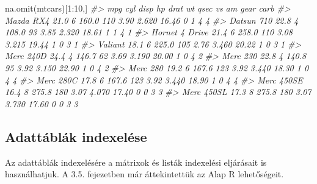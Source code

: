 \documentclass[
]{book}
\newenvironment{Shaded}{\begin{snugshade}}{\end{snugshade}}
\newcommand{\CommentTok}[1]{\textcolor[rgb]{0.56,0.35,0.01}{\textit{#1}}}
\newcommand{\DecValTok}[1]{\textcolor[rgb]{0.00,0.00,0.81}{#1}}
\newcommand{\FunctionTok}[1]{\textcolor[rgb]{0.00,0.00,0.00}{#1}}
\newcommand{\NormalTok}[1]{#1}
\newcommand{\SpecialCharTok}[1]{\textcolor[rgb]{0.00,0.00,0.00}{#1}}
\begin{document}
\begin{Shaded}
\begin{Highlighting}[]
\FunctionTok{na.omit}\NormalTok{(mtcars)[}\DecValTok{1}\SpecialCharTok{:}\DecValTok{10}\NormalTok{,]}
\CommentTok{\#\textgreater{}                 mpg cyl  disp  hp drat    wt  qsec vs am gear carb}
\CommentTok{\#\textgreater{} Mazda RX4      21.0   6 160.0 110 3.90 2.620 16.46  0  1    4    4}
\CommentTok{\#\textgreater{} Datsun 710     22.8   4 108.0  93 3.85 2.320 18.61  1  1    4    1}
\CommentTok{\#\textgreater{} Hornet 4 Drive 21.4   6 258.0 110 3.08 3.215 19.44  1  0    3    1}
\CommentTok{\#\textgreater{} Valiant        18.1   6 225.0 105 2.76 3.460 20.22  1  0    3    1}
\CommentTok{\#\textgreater{} Merc 240D      24.4   4 146.7  62 3.69 3.190 20.00  1  0    4    2}
\CommentTok{\#\textgreater{} Merc 230       22.8   4 140.8  95 3.92 3.150 22.90  1  0    4    2}
\CommentTok{\#\textgreater{} Merc 280       19.2   6 167.6 123 3.92 3.440 18.30  1  0    4    4}
\CommentTok{\#\textgreater{} Merc 280C      17.8   6 167.6 123 3.92 3.440 18.90  1  0    4    4}
\CommentTok{\#\textgreater{} Merc 450SE     16.4   8 275.8 180 3.07 4.070 17.40  0  0    3    3}
\CommentTok{\#\textgreater{} Merc 450SL     17.3   8 275.8 180 3.07 3.730 17.60  0  0    3    3}
\end{Highlighting}
\end{Shaded}

\hypertarget{adattuxe1bluxe1k-indexeluxe9se}{%
\subsection{Adattáblák indexelése}\label{adattuxe1bluxe1k-indexeluxe9se}}

Az adattáblák indexelésére a mátrixok és listák indexelési eljárásait is használhatjuk. A 3.5. fejezetben már áttekintettük az Alap R lehetőségeit.
\end{document}

